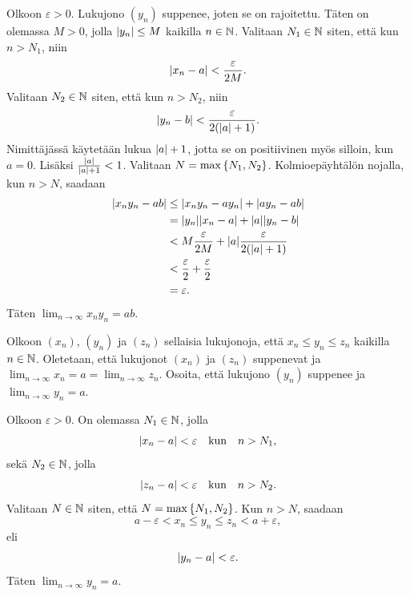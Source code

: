 \documentclass[11pt,a4paper]{amsart}
\begin{document}
\begin{solution}
  Olkoon \(\varepsilon > 0\). Lukujono \((y_n)\) suppenee, joten se on rajoitettu.
  Täten on olemassa \(M > 0\), jolla \(\lvert y_n\rvert \leq M\) kaikilla
  \(n \in \mathbb{N}\). Valitaan \(N_1 \in \mathbb{N}\) siten, että kun \(n > N_1\), niin
  \[
    \lvert x_n - a\rvert < \frac{\varepsilon}{2M}.
  \]
  Valitaan \(N_2 \in \mathbb{N}\) siten, että kun \(n > N_2\), niin
  \[
    \lvert y_n - b\rvert < \frac{\varepsilon}{2(\lvert a\rvert + 1)}.
  \]
  Nimittäjässä käytetään lukua \(\lvert a\rvert + 1\), jotta se on positiivinen
  myös silloin, kun \(a = 0\). Lisäksi \(\frac{\lvert a\rvert}{\lvert a\rvert + 1} < 1\).
  Valitaan \(N = \max\left\lbrace N_1, N_2\right\rbrace\). Kolmioepäyhtälön nojalla,
  kun \(n > N\), saadaan
  \[
    \begin{aligned}
      \lvert x_ny_n - ab\rvert &\leq \lvert x_ny_n - ay_n\rvert + \lvert ay_n - ab\rvert \\
      &= \lvert y_n\rvert\lvert x_n - a\rvert + \lvert a\rvert\lvert y_n - b\rvert \\
      &< M\frac{\varepsilon}{2M} + \lvert a\rvert\frac{\varepsilon}{2(\lvert a\rvert + 1)} \\
      &< \frac{\varepsilon}{2} + \frac{\varepsilon}{2} \\
      &= \varepsilon.
    \end{aligned}
  \]
  Täten \(\lim_{n \to \infty} x_ny_n = ab\).
\end{solution}

\begin{exercise}
  Olkoon \((x_n)\), \((y_n)\) ja \((z_n)\) sellaisia lukujonoja, että
  \(x_n \leq y_n \leq z_n\) kaikilla \(n \in \mathbb{N}\). Oletetaan, että
  lukujonot \((x_n)\) ja \((z_n)\) suppenevat ja
  \(\lim_{n \to \infty} x_n = a = \lim_{n \to \infty} z_n\).
  Osoita, että lukujono \((y_n)\) suppenee ja \(\lim_{n \to \infty} y_n = a\).
\end{exercise}

\begin{solution}
  Olkoon \(\varepsilon > 0\). On olemassa \(N_1 \in \mathbb{N}\), jolla
  \[
    \lvert x_n - a\rvert < \varepsilon \quad \text{kun} \quad n > N_1,
  \]
  sekä \(N_2 \in \mathbb{N}\), jolla
  \[
    \lvert z_n - a\rvert < \varepsilon \quad \text{kun} \quad n > N_2.
  \]
  Valitaan \(N \in \mathbb{N}\) siten, että \(N = \max\left\lbrace N_1, N_2\right\rbrace\). Kun
  \(n > N\), saadaan
  \[
    a - \varepsilon < x_n \leq y_n \leq z_n < a + \varepsilon,
  \]
  eli
  \[
    \lvert y_n - a\rvert < \varepsilon.
  \]
  Täten \(\lim_{n \to \infty} y_n = a\).
\end{solution}
\end{document}
